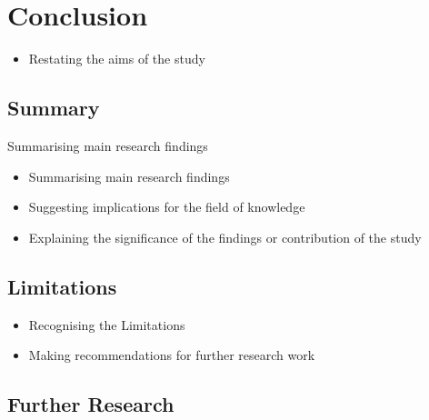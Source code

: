 \chapter{Conclusion}
\label{ch:Conclusion}

\begin{itemize}
    \item Restating the aims of the study
\end{itemize}

\section{Summary}
\label{sec:Conclusion:Summary}
Summarising main research findings
\begin{itemize}
    \item Summarising main research findings
    \item Suggesting implications for the field of knowledge
    \item Explaining the significance of the findings or contribution of the study
\end{itemize}

\section{Limitations}
\label{sec:Conclusion:Limitations}
\begin{itemize}
    \item Recognising the Limitations
    \item Making recommendations for further research work 
\end{itemize}

\section{Further Research}
\label{sec:Conclusion:PossibleExtensions}

